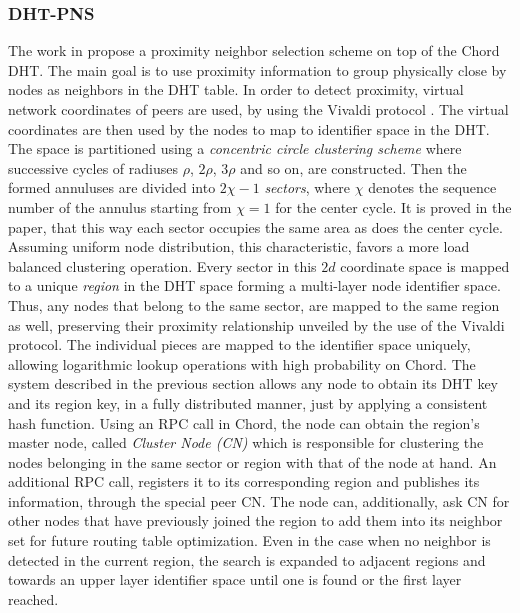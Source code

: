 
\subsubsection{DHT-PNS}
The work in \cite{DLTZZ2006} propose a proximity neighbor selection
scheme on top of the Chord DHT. The main goal is to use proximity information
to group physically close by nodes as neighbors in the DHT table. In order to
detect proximity, virtual network coordinates of peers are used, by using the
Vivaldi protocol \cite{cox_vivaldi_2004}. The virtual coordinates are then used
by the nodes to map to identifier space in the DHT. The space is partitioned
using a \emph{concentric circle clustering scheme} where successive cycles of
radiuses $\rho$, $2\rho$, $3\rho$ and so on, are constructed. Then the formed
annuluses are divided into $2\chi-1$ \emph{sectors}, where $\chi$ denotes the
sequence number of the annulus starting from $\chi = 1$ for the center cycle. It
is proved in the paper, that this way each sector occupies the same area as does
the center cycle. Assuming uniform node distribution, this characteristic,
favors a more load balanced clustering operation. Every sector in this $2d$
coordinate space is mapped to a unique \emph{region} in the DHT space forming a
multi-layer node identifier space.  Thus, any nodes that belong to the same
sector, are mapped to the same region as well, preserving their proximity
relationship unveiled by the use of the Vivaldi protocol. The individual pieces
are mapped to the identifier space uniquely, allowing logarithmic lookup
operations with high probability on Chord. The system described in the previous
section allows any node to obtain its DHT key and its region key, in a fully
distributed manner, just by applying a consistent hash function. Using an RPC
call in Chord, the node can obtain the region's master node, called
\emph{Cluster Node (CN)} which is responsible for clustering the nodes belonging
in the same sector or region with that of the node at hand. An additional RPC
call, registers it to its corresponding region and publishes its information,
through the special peer CN. The node can, additionally, ask CN for other
nodes that have previously joined the region to add them into its
neighbor set for future routing table optimization. Even in the case when no
neighbor is detected in the current region, the search is expanded to adjacent
regions and towards an upper layer identifier space until one is found or the
first layer reached.

